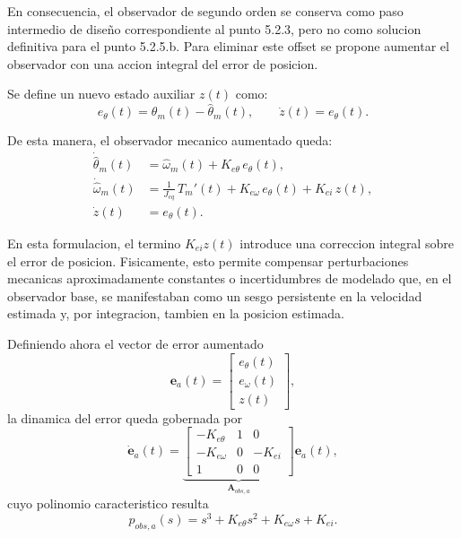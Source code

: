 \documentclass[12pt, a4paper,journal, onecolumn, compsoc]{IEEEtran}
\begin{document}
En consecuencia, el observador de segundo orden se conserva como paso intermedio de diseño correspondiente al punto 5.2.3, pero no como solucion definitiva para el punto 5.2.5.b. Para eliminar este offset se propone aumentar el observador con una accion integral del error de posicion.

Se define un nuevo estado auxiliar $z(t)$ como:
\begin{equation}
\label{eq:def_z_obs}
e_{\theta}(t)=\theta_m(t)-\hat{\theta}_m(t),
\qquad
\dot z(t)=e_{\theta}(t).
\end{equation}

De esta manera, el observador mecanico aumentado queda:
\begin{equation}
\label{eq:obs_integral}
\begin{aligned}
    \dot{\hat{\theta}}_m(t) &= \hat{\omega}_m(t) + K_{e\theta}\,e_{\theta}(t), \\
    \dot{\hat{\omega}}_m(t) &= \frac{1}{J_{eq}}\,T_m'(t) + K_{e\omega}\,e_{\theta}(t) + K_{ei}\,z(t), \\
    \dot z(t) &= e_{\theta}(t).
\end{aligned}
\end{equation}

En esta formulacion, el termino $K_{ei}z(t)$ introduce una correccion integral sobre el error de posicion. Fisicamente, esto permite compensar perturbaciones mecanicas aproximadamente constantes o incertidumbres de modelado que, en el observador base, se manifestaban como un sesgo persistente en la velocidad estimada y, por integracion, tambien en la posicion estimada.

Definiendo ahora el vector de error aumentado
\begin{equation}
\mathbf e_a(t)=
\begin{bmatrix}
e_\theta(t)\\
e_\omega(t)\\
z(t)
\end{bmatrix},
\end{equation}
la dinamica del error queda gobernada por
\begin{equation}
\dot{\mathbf e}_a(t)=
\underbrace{
\begin{bmatrix}
-K_{e\theta} & 1 & 0\\
-K_{e\omega} & 0 & -K_{ei}\\
1 & 0 & 0
\end{bmatrix}
}_{\mathbf A_{obs,a}}
\mathbf e_a(t),
\end{equation}
cuyo polinomio caracteristico resulta
\begin{equation}
\label{eq:polinomio_obs_integral}
p_{obs,a}(s)=s^3+K_{e\theta}s^2+K_{e\omega}s+K_{ei}.
\end{equation}
\end{document}
